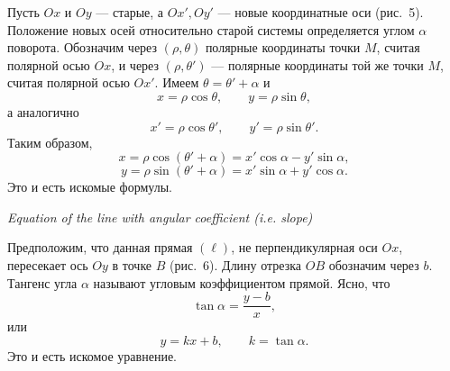 \begin{rusblock}
Пусть $Ox$ и $Oy$ --- старые, а $Ox',Oy'$ --- новые координатные оси (рис.~5). Положение новых осей относительно старой системы определяется углом $\alpha$ поворота. Обозначим через $(\rho,\theta)$ полярные координаты точки $M$, считая полярной осью $Ox$, и через $(\rho,\theta')$ --- полярные координаты той же точки $M$, считая полярной осью $Ox'$. Имеем $\theta=\theta'+\alpha$ и
\[
x=\rho\cos\theta,\qquad y=\rho\sin\theta,
\]
а аналогично
\[
x'=\rho\cos\theta',\qquad y'=\rho\sin\theta'.
\]
Таким образом,
\[
x=\rho\cos(\theta'+\alpha)=x'\cos\alpha-y'\sin\alpha,
\]
\[
y=\rho\sin(\theta'+\alpha)=x'\sin\alpha+y'\cos\alpha.
\]
Это и есть искомые формулы.
\end{rusblock}

{\noindent\bfseries{}\par}
{\noindent\itshape Equation of the line with angular coefficient (i.e. slope)\par}
\begin{rusblock}
Предположим, что данная прямая $(\ell)$, не перпендикулярная оси $Ox$, пересекает ось $Oy$ в точке $B$ (рис.~6). Длину отрезка $OB$ обозначим через $b$. Тангенс угла $\alpha$ называют угловым коэффициентом прямой. Ясно, что
\[
\tan\alpha=\frac{y-b}{x},
\]
или
\[
y=kx+b,\qquad k=\tan\alpha.
\]
Это и есть искомое уравнение.
\end{rusblock}

